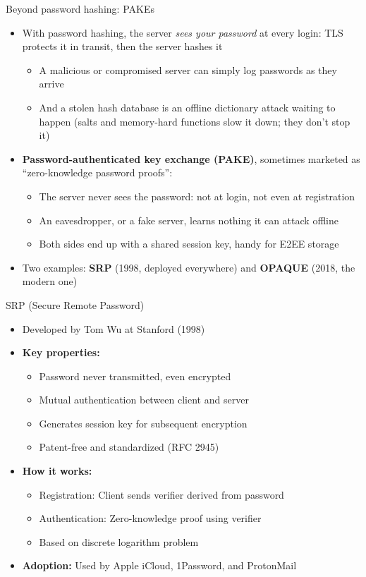 \ifdefined\PRESENTATION\else\PassOptionsToClass{handout}{beamer}\fi\documentclass[aspectratio=169, lualatex]{beamer}
\begin{document}
\begin{frame}{Beyond password hashing: PAKEs}
	\begin{itemize}
		\item With password hashing, the server \textit{sees your password} at every login: TLS protects it in transit, then the server hashes it
		      \begin{itemize}
			      \item A malicious or compromised server can simply log passwords as they arrive
			      \item And a stolen hash database is an offline dictionary attack waiting to happen (salts and memory-hard functions slow it down; they don't stop it)
		      \end{itemize}
		\item \textbf{Password-authenticated key exchange (PAKE)}, sometimes marketed as ``zero-knowledge password proofs'':
		      \begin{itemize}
			      \item The server never sees the password: not at login, not even at registration
			      \item An eavesdropper, or a fake server, learns nothing it can attack offline
			      \item Both sides end up with a shared session key, handy for E2EE storage
		      \end{itemize}
		\item Two examples: \textbf{SRP} (1998, deployed everywhere) and \textbf{OPAQUE} (2018, the modern one)
	\end{itemize}
\end{frame}

\begin{frame}{SRP (Secure Remote Password)}
	\begin{itemize}
		\item Developed by Tom Wu at Stanford (1998)
		\item \textbf{Key properties:}
		      \begin{itemize}
			      \item Password never transmitted, even encrypted
			      \item Mutual authentication between client and server
			      \item Generates session key for subsequent encryption
			      \item Patent-free and standardized (RFC 2945)
		      \end{itemize}
		\item \textbf{How it works:}
		      \begin{itemize}
			      \item Registration: Client sends verifier derived from password
			      \item Authentication: Zero-knowledge proof using verifier
			      \item Based on discrete logarithm problem
		      \end{itemize}
		\item \textbf{Adoption:} Used by Apple iCloud, 1Password, and ProtonMail
	\end{itemize}
\end{frame}
\end{document}
